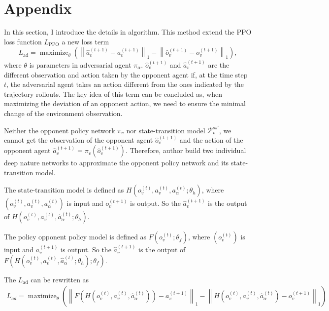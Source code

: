 \documentclass[a4paper]{article}
\begin{document}
\section*{Appendix}
In this section, I introduce the details in algorithm. This method extend the PPO loss function $L_\text{PPO}$ a new loss term
\begin{equation}
    L_\text{ad}=\operatorname{maximize}_{\theta}\left(\left\|\hat{a}_{v}^{(t+1)}-a_{v}^{(t+1)}\right\|_{1}-\left\|\hat{o}_{v}^{(t+1)}-o_{v}^{(t+1)}\right\|_{1}\right),
\end{equation}
where $\theta$ is parameters in adversarial agent $\pi_\alpha$.
$\hat{o}_v^{(t+1)}$ and $\hat{a}_v^{(t+1)}$ are the different observation and action taken by the opponent agent if, 
at the time step $t$, the adversarial agent takes an action different from the ones indicated by the trajectory rollouts.
The key idea of this term can be concluded as, 
when maximizing the deviation of an opponent action,
we need to ensure the minimal change of the environment observation. 

Neither the opponent policy network $\pi_v$ nor state-transition model $\mathcal{P}_v^{ss'}$,
we cannot get the observation of the opponent agent $\hat{o}_v^{(t+1)}$ and the action of the opponent agent $\hat{a}_v^{(t+1)} = \pi_v(\hat{o}_v^{(t+1)})$.
Therefore, author build two individual deep nature networks to approximate the opponent policy network and its state-transition model.

The state-transition model is defined as $H(o_v^{(t)},a_v^{(t)},a_\alpha^{(t)}; \theta_h)$, where $(o_v^{(t)},a_v^{(t)},a_\alpha^{(t)})$ is input and $o_v^{(t+1)}$ is output.
So the $\hat{a}_{v}^{(t+1)}$ is the output of $H(o_v^{(t)},a_v^{(t)},\hat{a}_\alpha^{(t)}; \theta_h)$.

The policy opponent policy model is defined as $F(o_v^{(t)}; \theta_f)$, where $(o_v^{(t)})$ is input and $a_v^{(t+1)}$ is output.
So the $\hat{a}_{v}^{(t+1)}$ is the output of $F(H(o_v^{(t)},a_v^{(t)},\hat{a}_\alpha^{(t)}; \theta_h);\theta_f)$. 

The $L_\text{ad}$ can be rewritten as
\begin{equation}
    \begin{aligned}
        L_{a d}= \operatorname{maximize}_{\theta}\left(\left\|F\left(H\left(o_{v}^{(t)}, a_{v}^{(t)}, \hat{a}_{\alpha}^{(t)}\right)\right)-a_{v}^{(t+1)}\right\|_{1}-\left\|H\left(o_{v}^{(t)}, a_{v}^{(t)}, \hat{a}_{\alpha}^{(t)}\right)-o_{v}^{(t+1)}\right\|_{1}\right)
    \end{aligned}    
\end{equation}
\end{document}
